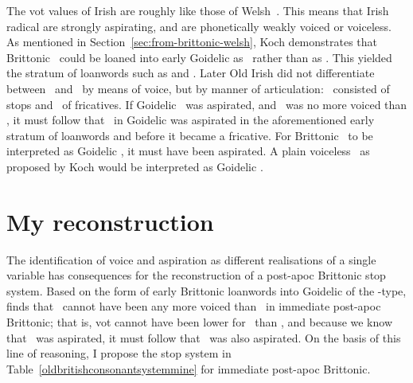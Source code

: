 The \gls{vot} values of Irish are roughly like those of Welsh~\autocite[85--86]{OD_Irish92}. This means that Irish radical  are strongly aspirating, and  are phonetically weakly voiced or voiceless. As mentioned in Section~\ref{sec:from-brittonic-welsh}, Koch demonstrates that Brittonic \lT\ could be loaned into early Goidelic as \lT\ rather than as \xD. This yielded the stratum of loanwords such as  and . Later Old Irish did not differentiate between \xT\ and \lT\ by means of voice, but by manner of articulation: \xT\ consisted of stops and \lT\ of fricatives. If Goidelic \xT\ was aspirated, and \lT\ was no more voiced than \xT, it must follow that \lT\ in Goidelic was aspirated in the aforementioned early stratum of loanwords and before it became a fricative. For Brittonic \lT\ to be interpreted as Goidelic \lT, it must have been aspirated. A plain voiceless \lT\ as proposed by Koch would be interpreted as Goidelic \xD. 

\section{My reconstruction}
\label{sec:my-reconstruction}
The identification of voice and aspiration as different realisations of a single variable has consequences for the reconstruction of a post-\gls{apoc} Brittonic stop system. Based on the form of early Brittonic loanwords into Goidelic of the -type, \textcite{koch_*cothairche_1990} finds that \lT\ cannot have been any more voiced than \xT\ in immediate post-\gls{apoc} Brittonic; that is, \gls{vot} cannot have been lower for \lT\ than \xT, and because we know that \xT\ was aspirated, it must follow that \lT\ was also aspirated. On the basis of this line of reasoning, I propose the stop system in Table~\ref{oldbritishconsonantsystemmine} for immediate post-\gls{apoc} Brittonic.

